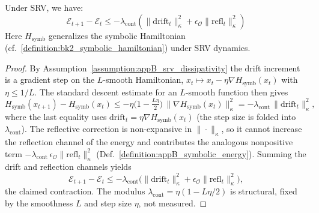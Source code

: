 \begin{lemma}
\label{lemma:appB_energy_contraction}
Under SRV, we have:
\[
\mathcal{E}_{t+1} - \mathcal{E}_t \leq -\lambda_{\text{cont}} \left( \|\text{drift}_t\|_\kappa^2 + \epsilon_{\mathcal{O}}\|\text{refl}_t\|_\kappa^2 \right)
\]
Here $H_{\text{symb}}$ generalizes the symbolic Hamiltonian (cf.~\ref{definition:bk2_symbolic_hamiltonian}) under SRV dynamics.
\end{lemma}
\begin{proof}
\label{proof:appB_energy_contraction}
\leavevmode
By Assumption~\ref{assumption:appB_srv_dissipativity} the drift increment is a gradient step on the $L$-smooth Hamiltonian, $x_t\mapsto x_t-\eta\nabla H_{\text{symb}}(x_t)$ with $\eta\le 1/L$. The standard descent estimate for an $L$-smooth function then gives
\[
H_{\text{symb}}(x_{t+1})-H_{\text{symb}}(x_t)\le -\eta\big(1-\tfrac{L\eta}{2}\big)\,\|\nabla H_{\text{symb}}(x_t)\|_\kappa^2=-\lambda_{\text{cont}}\,\|\text{drift}_t\|_\kappa^2,
\]
where the last equality uses $\text{drift}_t=\eta\nabla H_{\text{symb}}(x_t)$ (the step size is folded into $\lambda_{\text{cont}}$). The reflective correction is non-expansive in $\|\cdot\|_\kappa$, so it cannot increase the reflection channel of the energy and contributes the analogous nonpositive term $-\lambda_{\text{cont}}\,\epsilon_{\mathcal{O}}\|\text{refl}_t\|_\kappa^2$ (Def.~\ref{definition:appB_symbolic_energy}). Summing the drift and reflection channels yields
\[
\mathcal{E}_{t+1}-\mathcal{E}_t\le -\lambda_{\text{cont}}\big(\|\text{drift}_t\|_\kappa^2+\epsilon_{\mathcal{O}}\|\text{refl}_t\|_\kappa^2\big),
\]
the claimed contraction. The modulus $\lambda_{\text{cont}}=\eta(1-L\eta/2)$ is structural, fixed by the smoothness $L$ and step size $\eta$, not measured.
\end{proof}

